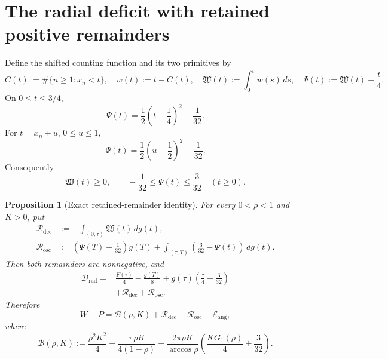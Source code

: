 \documentclass[11pt]{article}
\newtheorem{proposition}[lemma]{Proposition}
\theoremstyle{remark}
\begin{document}
\section{The radial deficit with retained positive remainders}

Define the shifted counting function and its two primitives by
\begin{equation}
 C(t):=\#\{n\geq1:x_n<t\},
 \quad
 w(t):=t-C(t),
 \quad
 \mathfrak W(t):=\int_0^tw(s)\,ds,
 \quad
 \Psi(t):=\mathfrak W(t)-\frac t4.
 \label{eq:sawtooth-def}
\end{equation}
On $0\leq t\leq3/4$,
\begin{equation}
 \Psi(t)=\frac12\left(t-\frac14\right)^2-\frac1{32}.
 \label{eq:first-cell}
\end{equation}
For $t=x_n+u$, $0\leq u\leq1$,
\begin{equation}
 \Psi(t)=\frac12\left(u-\frac12\right)^2-\frac1{32}.
 \label{eq:periodic-cell}
\end{equation}
Consequently
\begin{equation}
 \mathfrak W(t)\geq0,
 \qquad
 -\frac1{32}\leq\Psi(t)\leq\frac3{32}
 \quad(t\geq0).
 \label{eq:sawtooth-bounds}
\end{equation}

\begin{proposition}[Exact retained-remainder identity]
\label{prop:exact-deficit}
For every $0<\rho<1$ and $K>0$, put
\begin{align}
 \mathcal R_{\mathrm{dec}}
 &:=-\int_{(0,\tau)}\mathfrak W(t)\,dg(t),
 \label{eq:R-dec}\\
 \mathcal R_{\mathrm{osc}}
 &:={}
 \left(\Psi(T)+\frac1{32}\right)g(T)
 +\int_{(\tau,T)}
       \left(\frac3{32}-\Psi(t)\right)\,dg(t).
 \label{eq:R-osc}
\end{align}
Then both remainders are nonnegative, and
\begin{equation}
 \begin{aligned}
 \mathcal D_{\mathrm{rad}}
 ={}&\frac{F(\tau)}4-\frac{g(T)}8
 +g(\tau)\left(\frac\tau4+\frac3{32}\right)\\
 &+\mathcal R_{\mathrm{dec}}+\mathcal R_{\mathrm{osc}}.
 \end{aligned}
 \label{eq:exact-radial-deficit}
\end{equation}
Therefore
\begin{equation}
 W-P=
 \mathcal B(\rho,K)
 +\mathcal R_{\mathrm{dec}}+\mathcal R_{\mathrm{osc}}
 -\mathcal E_{\mathrm{ang}},
 \label{eq:master-identity}
\end{equation}
where
\begin{equation}
 \mathcal B(\rho,K):=
 \frac{\rho^2K^2}{4}
 -\frac{\pi\rho K}{4(1-\rho)}
 +\frac{2\pi\rho K}{\arccos\rho}
  \left(\frac{KG_1(\rho)}4+\frac3{32}\right).
 \label{eq:B-def}
\end{equation}
\end{proposition}
\end{document}
